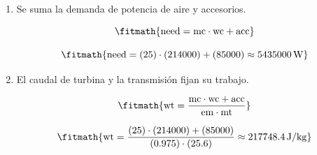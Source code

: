 \begin{enumerate}

\item Se suma la demanda de potencia de aire y accesorios.

\[\fitmath{\mathrm{need}=\mathrm{mc}\cdot \mathrm{wc}+\mathrm{acc}}\]

\[\fitmath{\mathrm{need}=(25)\cdot (214000)+(85000)\approx 5435000\,\mathrm{W}}\]

\item El caudal de turbina y la transmisión fijan su trabajo.

\[\fitmath{\mathrm{wt}=\frac{\mathrm{mc}\cdot \mathrm{wc}+\mathrm{acc}}{\mathrm{em}\cdot \mathrm{mt}}}\]

\[\fitmath{\mathrm{wt}=\frac{(25)\cdot (214000)+(85000)}{(0.975)\cdot (25.6)}\approx 217748.4\,\mathrm{J/kg}}\]

\end{enumerate}

